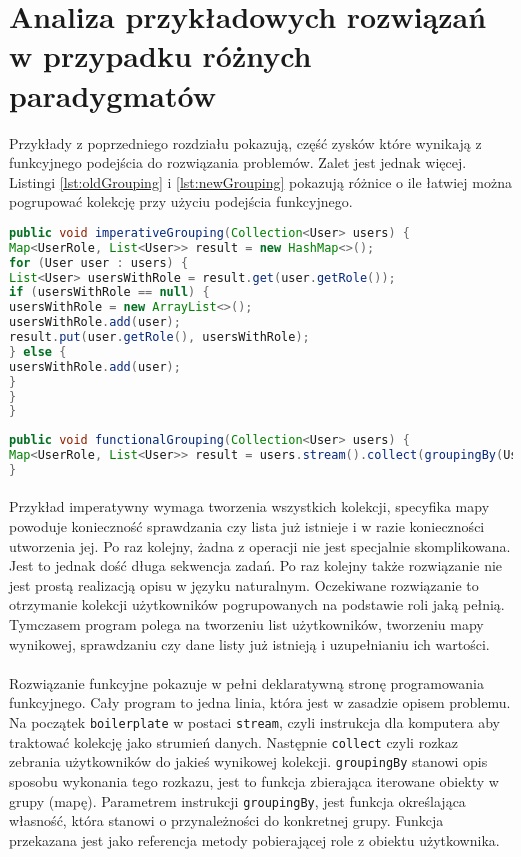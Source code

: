 \documentclass[a4paper,10pt]{report}
\begin{document}
\section{Analiza przykładowych rozwiązań w przypadku różnych paradygmatów}
Przykłady z poprzedniego rozdziału pokazują, część zysków które wynikają z funkcyjnego podejścia do rozwiązania problemów. Zalet jest jednak więcej. Listingi \ref{lst:oldGrouping}  i \ref{lst:newGrouping} pokazują różnice o ile łatwiej można pogrupować kolekcję przy użyciu podejścia funkcyjnego.
\begin{lstlisting}[caption={Podejście imperatywne},label={lst:oldGrouping},language=Java]
public void imperativeGrouping(Collection<User> users) {
Map<UserRole, List<User>> result = new HashMap<>();
for (User user : users) {
List<User> usersWithRole = result.get(user.getRole());
if (usersWithRole == null) {
usersWithRole = new ArrayList<>();
usersWithRole.add(user);
result.put(user.getRole(), usersWithRole);
} else {
usersWithRole.add(user);
}
}
}
\end{lstlisting}
\begin{lstlisting}[caption={Podejście funkcyjne},label={lst:newGrouping},language=Java]
public void functionalGrouping(Collection<User> users) {
Map<UserRole, List<User>> result = users.stream().collect(groupingBy(User::getRole));
}
\end{lstlisting}
\paragraph{}
Przykład imperatywny wymaga tworzenia wszystkich kolekcji, specyfika mapy powoduje konieczność sprawdzania czy lista już istnieje i w razie konieczności utworzenia jej. Po raz kolejny, żadna z operacji nie jest specjalnie skomplikowana. Jest to jednak dość długa sekwencja zadań. Po raz kolejny także rozwiązanie nie jest prostą realizacją opisu w języku naturalnym. Oczekiwane rozwiązanie to otrzymanie kolekcji użytkowników pogrupowanych na podstawie roli jaką pełnią. Tymczasem program polega na tworzeniu list użytkowników, tworzeniu mapy wynikowej, sprawdzaniu czy dane listy już istnieją i uzupełnianiu ich wartości. 
\paragraph{}
Rozwiązanie funkcyjne pokazuje w pełni deklaratywną stronę programowania funkcyjnego. Cały program to jedna linia, która jest w zasadzie opisem problemu. Na początek \verb|boilerplate| w postaci \verb|stream|, czyli instrukcja dla komputera aby traktować kolekcję jako strumień danych. Następnie \verb|collect| czyli rozkaz zebrania użytkowników do jakieś wynikowej kolekcji. \verb|groupingBy| stanowi opis sposobu wykonania tego rozkazu, jest to funkcja zbierająca iterowane obiekty w grupy (mapę). Parametrem instrukcji \verb|groupingBy|, jest funkcja określająca własność, która stanowi o przynależności do konkretnej grupy. Funkcja przekazana jest jako referencja metody pobierającej role z obiektu użytkownika.
\end{document}
